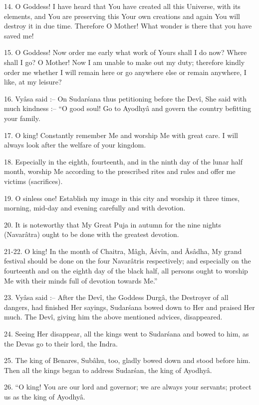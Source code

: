 14. O Goddess! I have heard that You have created all this Universe, with its elements, and You are preserving this Your own creations and again You will destroy it in due time. Therefore O Mother! What wonder is there that you have saved me!

15. O Goddess! Now order me early what work of Yours shall I do now? Where shall I go? O Mother! Now I am unable to make out my duty; therefore kindly order me whether I will remain here or go anywhere else or remain anywhere, I like, at my leisure?

16. Vy\^asa said :-- On Sudar\'sana thus petitioning before the Dev\^i, She said with much kindness :-- ``O good soul! Go to Ayodhy\^a and govern the country befitting your family.

17. O king! Constantly remember Me and worship Me with great care. I will always look after the welfare of your kingdom.

18. Especially in the eighth, fourteenth, and in the ninth day of the lunar half month, worship Me according to the prescribed rites and rules and offer me victims (sacrifices).

19. O sinless one! Establish my image in this city and worship it three times, morning, mid-day and evening carefully and with devotion.

20. It is noteworthy that My Great Puja in autumn for the nine nights (Navar\^atra) ought to be done with the greatest devotion.

21-22. O king! In the month of Chaitra, M\^agh, Â\'sv\^in, and Âs\^adha, My grand festival should be done on the four Navar\^atris respectively; and especially on the fourteenth and on the eighth day of the black half, all persons ought to worship Me with their minds full of devotion towards Me.''

23. Vy\^asa said :-- After the Dev\^i, the Goddess Durg\^a, the Destroyer of all dangers, had finished Her sayings, Sudar\'sana bowed down to Her and praised Her much. The Dev\^i, giving him the above mentioned advices, disappeared.

24. Seeing Her disappear, all the kings went to Sudar\'sana and bowed to him, as the Devas go to their lord, the Indra.

25. The king of Benares, Sub\^ahu, too, gladly bowed down and stood before him. Then all the kings began to address Sudar\'san, the king of Ayodhy\^a.

26. ``O king! You are our lord and governor; we are always your servants; protect us as the king of Ayodhy\^a.


